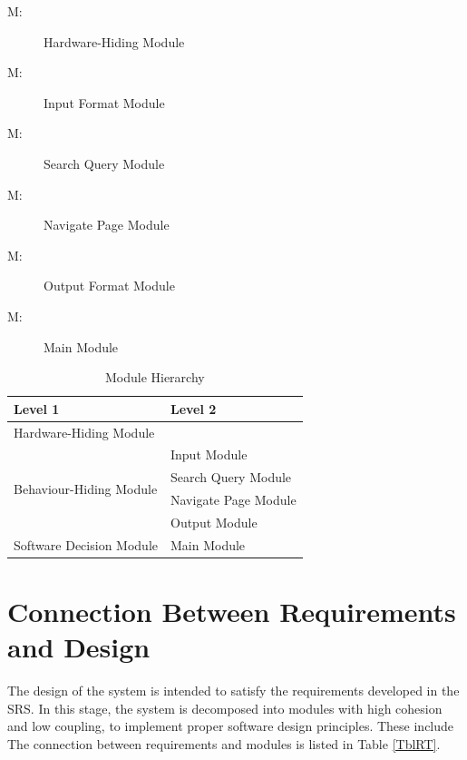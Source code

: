 \documentclass[12pt, titlepage]{article}
\newcounter{mnum}
\newcommand{\mthemnum}{M\themnum}
\begin{document}
\begin{description}
\item [ \mthemnum \label{mHH}:] Hardware-Hiding Module
\item [ \mthemnum \label{mInput}:] Input Format Module
\item [ \mthemnum \label{mSQ}:] Search Query Module
\item [ \mthemnum \label{mNP}:] Navigate Page Module
\item [ \mthemnum \label{mOutput}:] Output Format Module
\item [ \mthemnum \label{mMain}:] Main Module
\end{description}


\begin{table}[h!]
\centering
\begin{tabular}{p{} p{}}
\toprule
\textbf{Level 1} & \textbf{Level 2}\\
\midrule

{Hardware-Hiding Module} & ~ \\
\midrule

\multirow{4}{0.3\textwidth}{Behaviour-Hiding Module} 
& Input Module\\
& Search Query Module\\
& Navigate Page Module\\
& Output Module\\
\midrule

\multirow{1}{0.3\textwidth}{Software Decision Module} 
& Main Module\\
\bottomrule

\end{tabular}
\caption{Module Hierarchy}
\label{TblMH}
\end{table}

\section{Connection Between Requirements and Design} \label{SecConnection}

The design of the system is intended to satisfy the requirements developed in the SRS. In this stage, the system is decomposed into modules with high cohesion and low coupling, to implement proper software design principles. These include  The connection between requirements and modules is listed in Table \ref{TblRT}.
\end{document}
